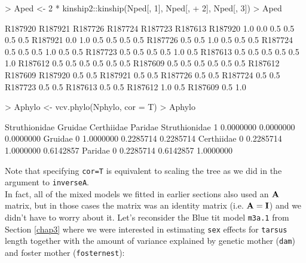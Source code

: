 \documentclass{article}
\begin{document}
\begin{Schunk}
\begin{Sinput}
> Aped <- 2 * kinship2::kinship(Nped[, 1], Nped[, 
+     2], Nped[, 3])
> Aped
\end{Sinput}
\begin{Soutput}
        R187920 R187921 R187726 R187724 R187723 R187613
R187920     1.0     0.0     0.5     0.5     0.5     0.5
R187921     0.0     1.0     0.5     0.5     0.5     0.5
R187726     0.5     0.5     1.0     0.5     0.5     0.5
R187724     0.5     0.5     0.5     1.0     0.5     0.5
R187723     0.5     0.5     0.5     0.5     1.0     0.5
R187613     0.5     0.5     0.5     0.5     0.5     1.0
R187612     0.5     0.5     0.5     0.5     0.5     0.5
R187609     0.5     0.5     0.5     0.5     0.5     0.5
        R187612 R187609
R187920     0.5     0.5
R187921     0.5     0.5
R187726     0.5     0.5
R187724     0.5     0.5
R187723     0.5     0.5
R187613     0.5     0.5
R187612     1.0     0.5
R187609     0.5     1.0
\end{Soutput}
\end{Schunk}

\begin{Schunk}
\begin{Sinput}
> Aphylo <- vcv.phylo(Nphylo, cor = T)
> Aphylo
\end{Sinput}
\begin{Soutput}
              Struthionidae   Gruidae Certhiidae   Paridae
Struthionidae             1 0.0000000  0.0000000 0.0000000
Gruidae                   0 1.0000000  0.2285714 0.2285714
Certhiidae                0 0.2285714  1.0000000 0.6142857
Paridae                   0 0.2285714  0.6142857 1.0000000
\end{Soutput}
\end{Schunk}

Note that specifying \texttt{cor=T} is equivalent to scaling the tree as we did in the argument to \texttt{inverseA}.\\

In fact, all of the mixed models we fitted in earlier sections also used an ${\bf A}$ matrix, but in those cases the matrix was an identity matrix (i.e. ${\bf A}={\bf I}$) and we didn't have to worry about it. Let's reconsider the Blue tit model \texttt{m3a.1} from Section \ref{chap3} where we were interested in estimating \texttt{sex} effects for \texttt{tarsus} length together with the amount of variance explained by genetic mother (\texttt{dam}) and  foster mother  (\texttt{fosternest}):
\end{document}
